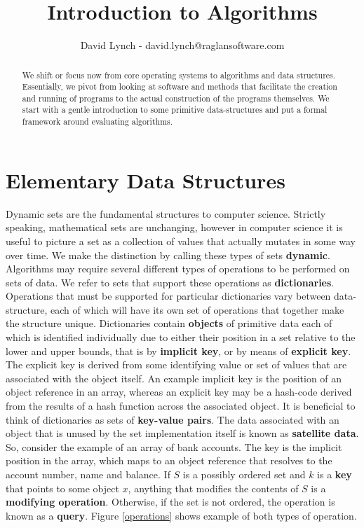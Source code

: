 \documentclass[10pt,a4paper]{article}
\title{Introduction to Algorithms}
\author{David Lynch - david.lynch@raglansoftware.com }
\begin{document}
\maketitle
\begin{abstract}
We shift or focus now from core operating systems to algorithms and data structures. Essentially, we pivot from looking at software and methods that facilitate the creation and running of programs to the actual construction of the programs themselves. We start with a gentle introduction to some primitive data-structures and put a formal framework around evaluating algorithms.
\end{abstract}
\section{Elementary Data Structures}
Dynamic sets are the fundamental structures to computer science. Strictly speaking, mathematical sets are unchanging, however in computer science it is useful to picture a set as a collection of values that actually mutates in some way over time. We make the distinction by calling these types of sets {\bf dynamic}. Algorithms may require several different types of operations to be performed on sets of data. We refer to sets that support these operations as {\bf dictionaries}. Operations that must be supported for particular dictionaries vary between data-structure, each of which will have its own set of operations that together make the structure unique. Dictionaries contain {\bf objects} of primitive data each of which is identified individually due to either their position in a set relative to the lower and upper bounds, that is by {\bf implicit key}, or by means of {\bf explicit key}. The explicit key is derived from some identifying value or set of values that are associated with the object itself. An example implicit key is the position of an object reference in an array, whereas an explicit key may be a hash-code derived from the results of a hash function across the associated object. It is beneficial to think of dictionaries as sets of {\bf key-value pairs}. The data associated with an object that is unused by the set implementation itself is known as {\bf satellite data}. So, consider the example of an array of bank accounts. The key is the implicit position in the array, which maps to an object reference that resolves to the account number, name and balance. 
\newline\newline
If $S$ is a possibly ordered set and $k$ is a {\bf key} that points to some object $x$, anything that modifies the contents of $S$ is a {\bf modifying operation}. Otherwise, if the set is not ordered, the operation is known as a {\bf query}. Figure \ref{operations} shows example of both types of operation.
\end{document}
